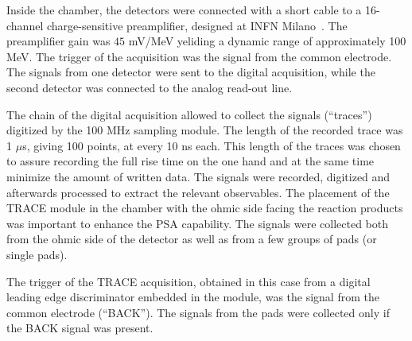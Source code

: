 \bigbreak

Inside the chamber, the detectors were connected with a short cable to a
16-channel charge-sensitive preamplifier, designed at INFN Milano~\cite{strano}.
The preamplifier gain was $45$ mV/MeV yeliding a dynamic range of
approximately 100 MeV. The trigger of the acquisition was the signal from the
common electrode. The signals from one detector were sent to the digital
acquisition, while the second detector was connected to the analog read-out
line.

\bigbreak

The chain of the digital acquisition allowed to collect the signals (“traces”)
digitized by the 100 MHz sampling module. The length of the recorded trace was
1 $\mu$s, giving 100 points, at every 10 ns each. This length of the traces
was chosen to assure recording the full rise time on the one hand and at the
same time minimize the amount of written data. The signals were recorded,
digitized and afterwards processed to extract the relevant observables. The
placement of the TRACE module in the chamber with the ohmic side facing the
reaction products was important to enhance the PSA capability. The signals
were collected both from the ohmic side of the detector as well as from a few
groups of pads (or single pads).

\bigbreak

The trigger of the TRACE acquisition, obtained in this case from a digital
leading edge discriminator embedded in the module, was the signal from the
common electrode (“BACK”). The signals from the pads were collected only if
the BACK signal was present.